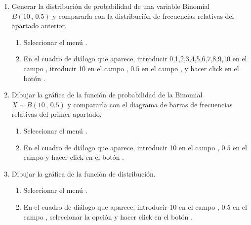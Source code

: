 \begin{enumerate}[leftmargin=*]
\begin{enumerate}
\item Generar la distribución de probabilidad de una variable Binomial $B(10\,,\,0.5)$ y compararla con la distribución de frecuencias relativas del apartado anterior.
\begin{indicacion}{
\begin{enumerate}
\item Seleccionar el menú .
\item En el cuadro de diálogo que aparece, introducir 0,1,2,3,4,5,6,7,8,9,10 en el campo ,
itroducir 10 en el campo , $0.5$ en el campo , y hacer click
en el botón .
\end{enumerate}}
\end{indicacion}

\item Dibujar la gráfica de la función de probabilidad de la Binomial $X\sim B(10\,,\,0.5)$ y compararla con el
diagrama de barras de frecuencias relativas del primer apartado.
\begin{indicacion}{
\begin{enumerate}
\item Seleccionar el menú .
\item En el cuadro de diálogo que aparece, introducir 10 en el campo ,
$0.5$ en el campo  y hacer click en el botón .
\end{enumerate}}
\end{indicacion}

\item Dibujar la gráfica de la función de distribución.
\begin{indicacion}{
\begin{enumerate}
\item Seleccionar el menú .
\item En el cuadro de diálogo que aparece, introducir 10 en el campo , $0.5$ en el campo
, seleccionar la opción  y hacer click en el botón
.
\end{enumerate}}
\end{indicacion}


\end{enumerate}
\end{enumerate}
